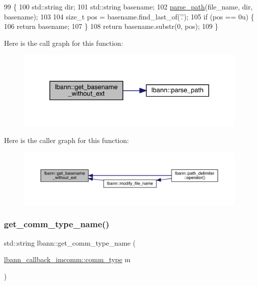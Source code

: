 \begin{DoxyCode}
99                                                               \{
100   std::string dir;
101   std::string basename;
102   \hyperlink{namespacelbann_a1ce6832a54235a5fb333f50fffbe1b63}{parse\_path}(file\_name, dir, basename);
103 
104   \textcolor{keywordtype}{size\_t} pos = basename.find\_last\_of(\textcolor{charliteral}{'.'});
105   \textcolor{keywordflow}{if} (pos == 0u) \{
106     \textcolor{keywordflow}{return} basename;
107   \}
108   \textcolor{keywordflow}{return} basename.substr(0, pos);
109 \}
\end{DoxyCode}
Here is the call graph for this function\+:\nopagebreak
\begin{figure}[H]
\begin{center}
\leavevmode
\includegraphics[width=324pt]{namespacelbann_aea9a4378326fd51236a8343c43cc4a7c_cgraph}
\end{center}
\end{figure}
Here is the caller graph for this function\+:\nopagebreak
\begin{figure}[H]
\begin{center}
\leavevmode
\includegraphics[width=350pt]{namespacelbann_aea9a4378326fd51236a8343c43cc4a7c_icgraph}
\end{center}
\end{figure}
\mbox{\label{namespacelbann_ab5665dc52c53faca0caa55b509e2e654}} 
\subsubsection{\texorpdfstring{get\+\_\+comm\+\_\+type\+\_\+name()}{get\_comm\_type\_name()}}
{\footnotesize\ttfamily std\+::string lbann\+::get\+\_\+comm\+\_\+type\+\_\+name (\begin{DoxyParamCaption}\item[{\hyperlink{classlbann_1_1lbann__callback__imcomm_acf7e894b3381e7f9b71020dc73594d6a}{lbann\+\_\+callback\+\_\+imcomm\+::comm\+\_\+type}}]{m }\end{DoxyParamCaption})}

